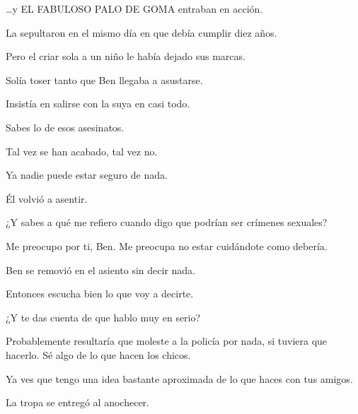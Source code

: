 \sk
\ldots{}y EL FABULOSO PALO DE GOMA entraban en acción. 

\sk
La sepultaron en el mismo día en que
debía cumplir diez años.

\sk
Pero el criar sola a un niño le había dejado sus marcas.

\sk
Solía toser tanto que Ben llegaba a asustarse.

\sk
Insistía en salirse con la suya en casi
todo. 

\sk
Sabes lo de esos asesinatos. 

\sk
Tal vez se han acabado,
tal vez no. 

\sk
Ya nadie puede estar seguro de nada. 

\sk
Él volvió a asentir. 

\sk
¿Y sabes a qué me refiero cuando digo que
podrían ser crímenes sexuales?

\sk
Me preocupo por ti, Ben. Me preocupa no
estar cuidándote como debería.

\sk
Ben se removió en el asiento sin decir nada.

\sk
Entonces escucha bien lo que voy a
decirte. 

\sk
¿Y te das cuenta de que hablo muy en serio?

\sk
Probablemente resultaría que moleste a la
policía por nada, si tuviera que hacerlo. Sé algo de
lo que hacen los chicos. 

\sk
Ya ves que tengo una idea
bastante aproximada de lo que haces con tus
amigos.

\sk
La tropa se entregó al anochecer. 


